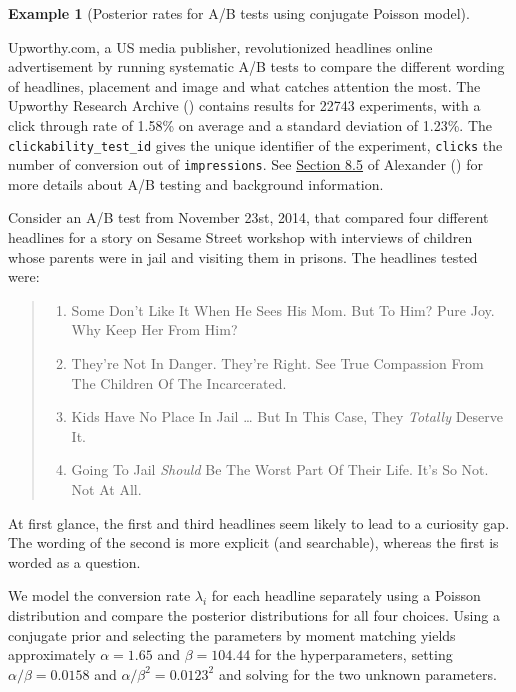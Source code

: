 \documentclass[
  11pt,
  letterpaper,
]{scrbook}
\providecommand{\tightlist}{%
  \setlength{\itemsep}{0pt}\setlength{\parskip}{0pt}}
\theoremstyle{definition}
\newtheorem{example}{Example}[chapter]
\theoremstyle{plain}
\theoremstyle{plain}
\theoremstyle{plain}
\theoremstyle{definition}
\theoremstyle{definition}
\theoremstyle{plain}
\theoremstyle{plain}
\theoremstyle{remark}
\begin{document}
\begin{example}[Posterior rates for A/B tests using conjugate Poisson
model]\protect\hypertarget{exm-abtest}{}\label{exm-abtest}

Upworthy.com, a US media publisher, revolutionized headlines online
advertisement by running systematic A/B tests to compare the different
wording of headlines, placement and image and what catches attention the
most. The Upworthy Research Archive () contains results for 22743 experiments, with a click
through rate of 1.58\% on average and a standard deviation of 1.23\%.
The \texttt{clickability\_test\_id} gives the unique identifier of the
experiment, \texttt{clicks} the number of conversion out of
\texttt{impressions}. See
\href{https://tellingstorieswithdata.com/08-hunt.html\#ab-testing}{Section
8.5} of Alexander () for more details
about A/B testing and background information.

Consider an A/B test from November 23st, 2014, that compared four
different headlines for a story on Sesame Street workshop with
interviews of children whose parents were in jail and visiting them in
prisons. The headlines tested were:

\begin{quote}
\begin{enumerate}
\def\labelenumi{\arabic{enumi}.}
\tightlist
\item
  Some Don't Like It When He Sees His Mom. But To Him? Pure Joy. Why
  Keep Her From Him?
\item
  They're Not In Danger. They're Right. See True Compassion From The
  Children Of The Incarcerated.
\item
  Kids Have No Place In Jail \ldots{} But In This Case, They
  \emph{Totally} Deserve It.
\item
  Going To Jail \emph{Should} Be The Worst Part Of Their Life. It's So
  Not. Not At All.
\end{enumerate}
\end{quote}

At first glance, the first and third headlines seem likely to lead to a
curiosity gap. The wording of the second is more explicit (and
searchable), whereas the first is worded as a question.

We model the conversion rate \(\lambda_i\) for each headline separately
using a Poisson distribution and compare the posterior distributions for
all four choices. Using a conjugate prior and selecting the parameters
by moment matching yields approximately \(\alpha = 1.65\) and
\(\beta = 104.44\) for the hyperparameters, setting
\(\alpha/\beta = 0.0158\) and \(\alpha/\beta^2=0.0123^2\) and solving
for the two unknown parameters.


\end{example}
\end{document}
